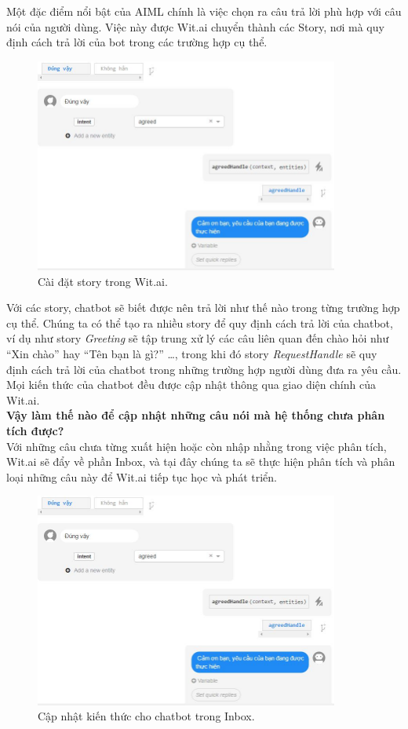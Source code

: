 \documentclass[12pt]{report}
\begin{document}
Một đặc điểm nổi bật của AIML chính là việc chọn ra câu trả lời phù hợp với câu nói của người dùng. Việc này được Wit.ai chuyển thành các Story, nơi mà quy định cách trả lời của bot trong các trường hợp cụ thể. 
 
\begin{figure}[H] \label{fig:story-wit}
	\centering
	\includegraphics[width=10cm]{Pics/Chap6/story.JPG}
	\caption{Cài đặt story trong Wit.ai.}
\end{figure}

Với các story, chatbot sẽ biết được nên trả lời như thế nào trong từng trường hợp cụ thể. Chúng ta có thể tạo ra nhiều story để quy định cách trả lời của chatbot, ví dụ như story \textit{Greeting} sẽ tập trung xử lý các câu liên quan đến chào hỏi như ``Xin chào'' hay ``Tên bạn là gì?'' \ldots, trong khi đó story \textit{RequestHandle} sẽ quy định cách trả lời của chatbot trong những trường hợp người dùng đưa ra yêu cầu. Mọi kiến thức của chatbot đều được cập nhật thông qua giao diện chính của Wit.ai. \\[0.5cm]
\noindent \textbf{Vậy làm thế nào để cập nhật những câu nói mà hệ thống chưa phân tích được?\\[0.5cm]}
Với những câu chưa từng xuất hiện hoặc còn nhập nhằng trong việc phân tích, Wit.ai sẽ đẩy về phần Inbox, và tại đây chúng ta sẽ thực hiện phân tích và phân loại những câu này để Wit.ai tiếp tục học và phát triển.

\begin{figure}[H] \label{fig:inbox-wit}
	\centering
	\includegraphics[width=10cm]{Pics/Chap6/story.JPG}
	\caption{Cập nhật kiến thức cho chatbot trong Inbox.}
\end{figure}
\end{document}
